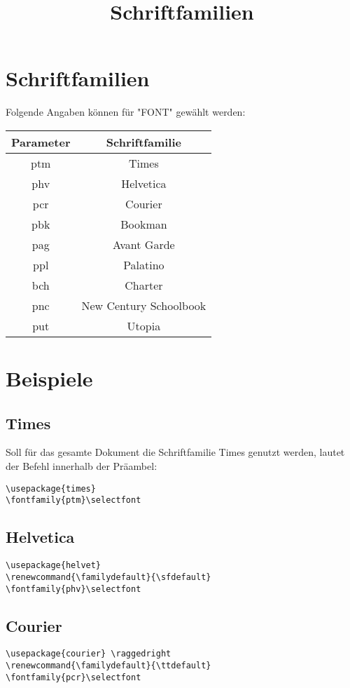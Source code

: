 \documentclass[11pt]{article}
\date{}
\author{}
\title{Schriftfamilien}
\begin{document}
\maketitle

\section{Schriftfamilien}
Folgende Angaben können für "FONT" gewählt werden:

\begin{center}
\begin{tabular}{|*{2}{c|}}
\hline
Parameter & Schriftfamilie \\ \hline 
ptm & Times \\ \hline 
phv & Helvetica \\ \hline 
pcr & Courier \\ \hline 
pbk & Bookman \\ \hline 
pag & Avant Garde \\ \hline 
ppl & Palatino \\ \hline 
bch & Charter \\ \hline 
pnc & New Century Schoolbook \\ \hline 
put & Utopia \\ \hline 
\end{tabular}
\end{center}



\section{Beispiele}
\subsection{Times}
Soll für das gesamte Dokument die Schriftfamilie Times genutzt werden, lautet der Befehl innerhalb der Präambel:

\begin{verbatim}
\usepackage{times}
\fontfamily{ptm}\selectfont
\end{verbatim}


\subsection{Helvetica}
\begin{verbatim}
\usepackage{helvet}
\renewcommand{\familydefault}{\sfdefault}
\fontfamily{phv}\selectfont
\end{verbatim}

\subsection{Courier}
\begin{verbatim}
\usepackage{courier} \raggedright
\renewcommand{\familydefault}{\ttdefault}  
\fontfamily{pcr}\selectfont
\end{verbatim}
\end{document}
